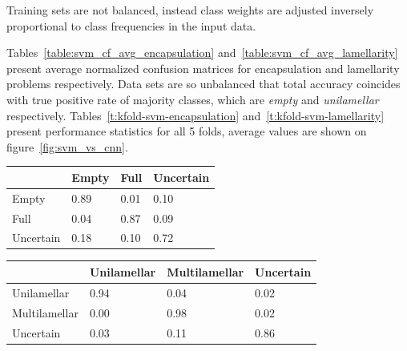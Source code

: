 \documentclass[a4paper, 11pt, table]{article}
\begin{document}
Training sets are not balanced, instead class weights are adjusted inversely proportional to class frequencies in the input data.

Tables~\ref{table:svm_cf_avg_encapsulation} and~\ref{table:svm_cf_avg_lamellarity} present average normalized confusion matrices for encapsulation and lamellarity problems respectively. Data sets are so unbalanced that total accuracy coincides with true positive rate of majority classes, which are \textit{empty} and \textit{unilamellar} respectively. Tables~\ref{t:kfold-svm-encapsulation} and~\ref{t:kfold-svm-lamellarity} present performance statistics for all 5 folds, average values are shown on figure~\ref{fig:svm_vs_cnn}.

\begin{center}
\label{table:svm_cf_avg_encapsulation}
\begin{tabular}{|L{2.5cm} |C{2.5cm} |C{2.5cm} |C{2.5cm}|}
\toprule
 & Empty & Full & Uncertain \\
\midrule
Empty & 0.89 & 0.01 & 0.10 \\
Full & 0.04 & 0.87 & 0.09 \\
Uncertain & 0.18 & 0.10 & 0.72 \\
\bottomrule
\end{tabular}
\end{center}

\begin{center}
\label{table:svm_cf_avg_lamellarity}
\begin{tabular}{|L{2.5cm} |C{2.5cm} |C{2.5cm} |C{2.5cm}|}
\toprule
 & Unilamellar & Multilamellar & Uncertain \\
\midrule
Unilamellar & 0.94 & 0.04 & 0.02 \\
Multilamellar & 0.00 & 0.98 & 0.02 \\
Uncertain & 0.03 & 0.11 & 0.86 \\
\bottomrule
\end{tabular}
\end{center}
\end{document}

